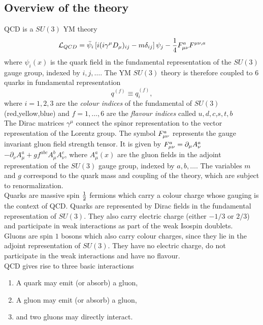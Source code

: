 \subsection{Overview of the theory}
QCD is a $SU(3)$ YM theory
\begin{equation}
	\label{eq:qcdlagrangian}
	\mathcal{L}_{QCD} = \bar{\psi}_i \left[i(i\gamma^\mu D_\mu)_{ij}-m \delta_{ij}\right]\psi_j - \frac{1}{4} F^a_{\mu \nu} F^{\mu \nu, a}
\end{equation}
where $\psi_i(x)$ is the quark field in the fundamental representation of the $SU(3)$ gauge group, indexed by $i,j,\dots$. The YM $SU(3)$ theory is therefore coupled to $6$ quarks in fundamental representation
\begin{equation}
q^{(f)} \equiv q^{(f)}_i,
\end{equation}
where $i=1,2,3$ are the \emph{colour indices} of the fundamental of $SU(3)$ (red,yellow,blue) and $f=1,\dots,6$ are the \emph{flavour indices} called $u,d,c$,$s,t,b$\\ The Dirac matrices $\gamma^\mu$ connect the spinor representation to the vector representation of the Lorentz group. The symbol $F^a_{\mu \nu}$ represents the gauge invariant gluon field strength tensor. It is given by $F^a_{\mu \nu} = \partial_\mu A^a_\nu$$ - \partial_\nu A^a_\mu +g f^{abc} A^b_\mu A^c_\nu$, where $A^a_\mu(x)$ are the gluon fields in the adjoint representation of the $SU(3)$ gauge group, indexed by $a,b,\dots$. The variables $m$ and $g$ correspond to the quark mass and coupling of the theory, which are subject to renormalization.\\
 Quarks are massive spin $\frac{1}{2}$ fermions which carry a colour charge whose gauging is the context of QCD. Quarks are represented by Dirac fields in the fundamental representation of $SU(3)$. They also carry electric charge (either $-1/3$ or $2/3$) and participate in weak interactions as part of the weak Isospin doublets.\\
Gluons are spin $1$ bosons which also carry colour charges, since they lie in the adjoint representation of $SU(3)$. They have no electric charge, do not participate in the weak interactions and have no flavour.\\
QCD gives rise to three basic interactions
\begin{enumerate}
	\item A quark may emit (or absorb) a gluon,
	\item A gluon may emit (or absorb) a gluon,
	\item and two gluons may directly interact.

\end{enumerate}$$
